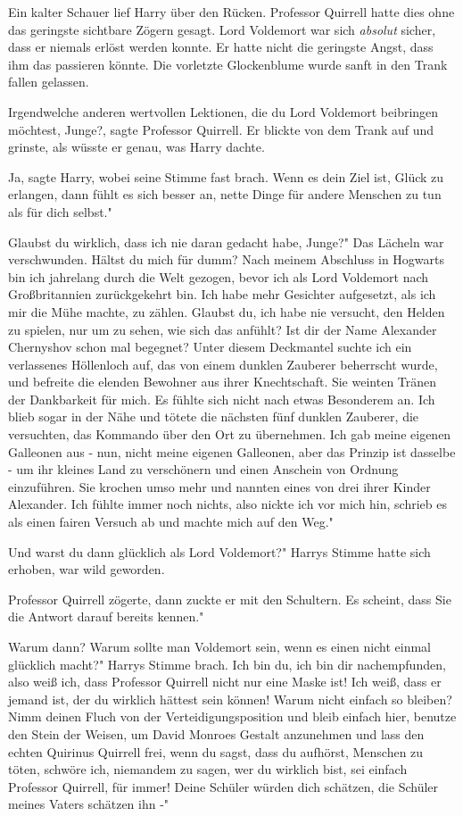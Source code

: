 Ein kalter Schauer lief Harry über den Rücken. Professor Quirrell hatte dies
ohne das geringste sichtbare Zögern gesagt. Lord Voldemort war sich
\emph{absolut} sicher, dass er niemals erlöst werden konnte. Er hatte nicht die
geringste Angst, dass ihm das passieren könnte. Die vorletzte Glockenblume wurde
sanft in den Trank fallen gelassen.

\glqq Irgendwelche anderen wertvollen Lektionen, die du Lord Voldemort
beibringen möchtest, Junge?\grqq{}, sagte Professor Quirrell. Er blickte von dem
Trank auf und grinste, als wüsste er genau, was Harry dachte.

\glqq Ja\grqq{}, sagte Harry, wobei seine Stimme fast brach. \glqq Wenn es dein
Ziel ist, Glück zu erlangen, dann fühlt es sich besser an, nette Dinge für
andere Menschen zu tun als für dich selbst."

\glqq Glaubst du wirklich, dass ich nie daran gedacht habe, Junge?" Das Lächeln
war verschwunden. \glqq Hältst du mich für dumm? Nach meinem Abschluss in
Hogwarts bin ich jahrelang durch die Welt gezogen, bevor ich als Lord Voldemort
nach Großbritannien zurückgekehrt bin. Ich habe mehr Gesichter aufgesetzt, als
ich mir die Mühe machte, zu zählen. Glaubst du, ich habe nie versucht, den
Helden zu spielen, nur um zu sehen, wie sich das anfühlt? Ist dir der Name
Alexander Chernyshov schon mal begegnet? Unter diesem Deckmantel suchte ich ein
verlassenes Höllenloch auf, das von einem dunklen Zauberer beherrscht wurde, und
befreite die elenden Bewohner aus ihrer Knechtschaft. Sie weinten Tränen der
Dankbarkeit für mich. Es fühlte sich nicht nach etwas Besonderem an. Ich blieb
sogar in der Nähe und tötete die nächsten fünf dunklen Zauberer, die versuchten,
das Kommando über den Ort zu übernehmen. Ich gab meine eigenen Galleonen aus -
nun, nicht meine eigenen Galleonen, aber das Prinzip ist dasselbe - um ihr
kleines Land zu verschönern und einen Anschein von Ordnung einzuführen. Sie
krochen umso mehr und nannten eines von drei ihrer Kinder Alexander. Ich fühlte
immer noch nichts, also nickte ich vor mich hin, schrieb es als einen fairen
Versuch ab und machte mich auf den Weg."

Und warst du dann glücklich als Lord Voldemort?" Harrys Stimme hatte sich
erhoben, war wild geworden.

Professor Quirrell zögerte, dann zuckte er mit den Schultern. \glqq Es scheint,
dass Sie die Antwort darauf bereits kennen."

\glqq Warum dann? Warum sollte man Voldemort sein, wenn es einen nicht einmal
glücklich macht?" Harrys Stimme brach. \glqq Ich bin du, ich bin dir
nachempfunden, also weiß ich, dass Professor Quirrell nicht nur eine Maske ist!
Ich weiß, dass er jemand ist, der du wirklich hättest sein können! Warum nicht
einfach so bleiben? Nimm deinen Fluch von der Verteidigungsposition und bleib
einfach hier, benutze den Stein der Weisen, um David Monroes Gestalt anzunehmen
und lass den echten Quirinus Quirrell frei, wenn du sagst, dass du aufhörst,
Menschen zu töten, schwöre ich, niemandem zu sagen, wer du wirklich bist, sei
einfach Professor Quirrell, für immer! Deine Schüler würden dich schätzen, die
Schüler meines Vaters schätzen ihn -"

